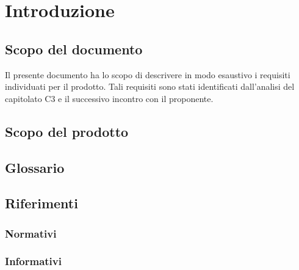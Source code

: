 
\section{Introduzione}

\subsection{Scopo del documento}
Il presente documento ha lo scopo di descrivere in modo esaustivo i requisiti individuati per il prodotto. Tali requisiti sono stati identificati dall’analisi del capitolato C3 e il successivo incontro con il proponente.

\subsection{Scopo del prodotto}

\subsection{Glossario}


\subsection{Riferimenti}


\subsubsection{Normativi}


\subsubsection{Informativi}
